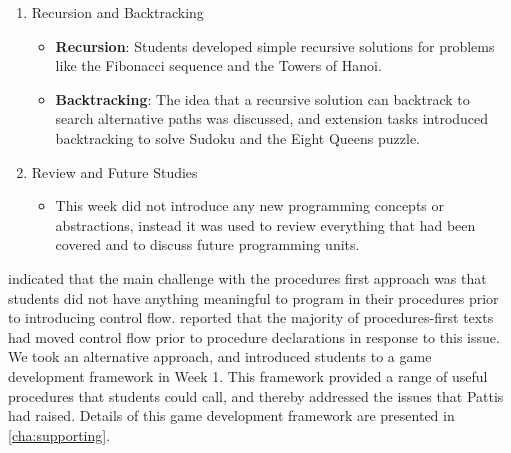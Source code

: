 \begin{enumerate}
  \item Recursion and Backtracking
  \begin{itemize}[noitemsep,nolistsep]
  	\item \textbf{Recursion}: Students developed simple recursive solutions for problems like the Fibonacci sequence and the Towers of Hanoi.
  	\item \textbf{Backtracking}: The idea that a recursive solution can backtrack to search alternative paths was discussed, and extension tasks introduced backtracking to solve Sudoku and the Eight Queens puzzle.
  \end{itemize}

  \item Review and Future Studies
  \begin{itemize}[noitemsep,nolistsep]
  	\item This week did not introduce any new programming concepts or abstractions, instead it was used to review everything that had been covered and to discuss future programming units.
  \end{itemize}
\end{enumerate}

\citet{Pattis:1990,Pattis:1993} indicated that the main challenge with the procedures first approach was that students did not have anything meaningful to program in their procedures prior to introducing control flow. \citet{Pattis:1993} reported that the majority of procedures-first texts had moved control flow prior to procedure declarations in response to this issue. We took an alternative approach, and introduced students to a game development framework in Week 1. This framework provided a range of useful procedures that students could call, and thereby addressed the issues that Pattis had raised. Details of this game development framework are presented in \cref{cha:supporting}.

